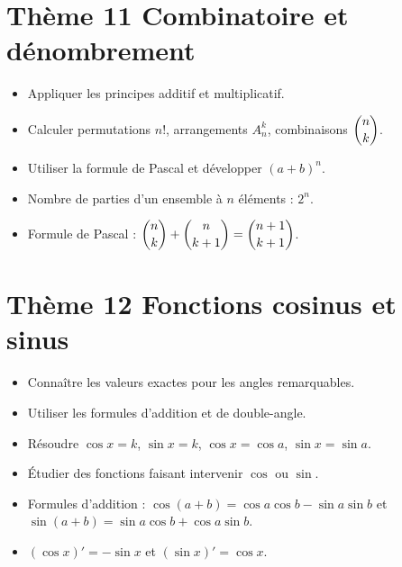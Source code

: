 \documentclass[11pt,a4paper,openany]{book}
\theoremstyle{definition}
\begin{document}
    \section*{Thème 11 \textemdash{} Combinatoire et dénombrement}
    \begin{capacitesbox}
    \begin{itemize}
        \item Appliquer les principes additif et multiplicatif.
        \item Calculer permutations $n!$, arrangements $A_n^k$, combinaisons
              $\dbinom{n}{k}$.
        \item Utiliser la formule de Pascal et développer $(a+b)^n$.
    \end{itemize}
    \end{capacitesbox}
    \begin{demoprogbox}
    \begin{itemize}
        \item Nombre de parties d'un ensemble à $n$ éléments : $2^n$.
        \item Formule de Pascal :
              $\dbinom{n}{k}+\dbinom{n}{k+1}=\dbinom{n+1}{k+1}$.
    \end{itemize}
    \end{demoprogbox}

    \section*{Thème 12 \textemdash{} Fonctions cosinus et sinus}
    \begin{capacitesbox}
    \begin{itemize}
        \item Connaître les valeurs exactes pour les angles remarquables.
        \item Utiliser les formules d'addition et de double-angle.
        \item Résoudre $\cos x=k$, $\sin x=k$, $\cos x=\cos a$,
              $\sin x=\sin a$.
        \item Étudier des fonctions faisant intervenir $\cos$ ou $\sin$.
    \end{itemize}
    \end{capacitesbox}
    \begin{demoprogbox}
    \begin{itemize}
        \item Formules d'addition :
              $\cos(a+b)=\cos a\cos b-\sin a\sin b$ et
              $\sin(a+b)=\sin a\cos b+\cos a\sin b$.
        \item $(\cos x)'=-\sin x$ et $(\sin x)'=\cos x$.
    \end{itemize}
    \end{demoprogbox}
\end{document}
